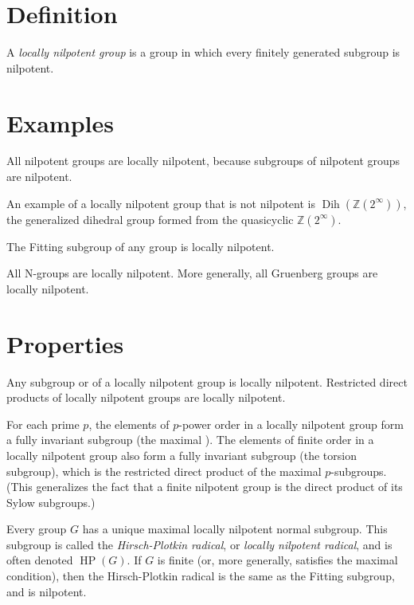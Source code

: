 \documentclass[12pt]{article}
\DeclareMathOperator{\Dih}{Dih}
\DeclareMathOperator{\HP}{HP}
\def\Z{\mathbb{Z}}
\begin{document}

\section*{Definition}

A \emph{locally nilpotent group} is 
a group in which every finitely generated subgroup is nilpotent.

\section*{Examples}

All nilpotent groups are locally nilpotent, 
because subgroups of nilpotent groups are nilpotent.

An example of a locally nilpotent group that is not nilpotent 
is $\Dih(\Z(2^\infty))$, the generalized dihedral group 
formed from the quasicyclic  $\Z(2^\infty)$.

The Fitting subgroup of any group is locally nilpotent.

All N-groups are locally nilpotent. More generally, all Gruenberg groups are locally nilpotent.

\section*{Properties}

Any subgroup or  of a locally nilpotent group is locally nilpotent.
Restricted direct products of locally nilpotent groups are locally nilpotent.

For each prime $p$, 
the elements of $p$-power order in a locally nilpotent group 
form a fully invariant subgroup
(the maximal ).
The elements of finite order in a locally nilpotent group 
also form a fully invariant subgroup (the torsion subgroup), 
which is the restricted direct product of the maximal $p$-subgroups.
(This generalizes the fact that a finite nilpotent group 
is the direct product of its Sylow subgroups.)

Every group $G$ has a unique maximal locally nilpotent normal subgroup.
This subgroup is called the \emph{Hirsch-Plotkin radical}, 
or \emph{locally nilpotent radical}, and is often denoted $\HP(G)$.
If $G$ is finite (or, more generally, satisfies the maximal condition),
then the Hirsch-Plotkin radical is the same as the Fitting subgroup,
and is nilpotent.
\end{document}
